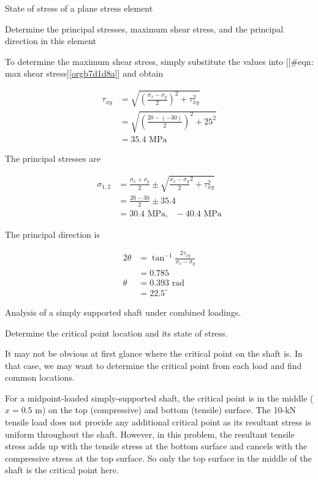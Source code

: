 \documentclass[a4paper,openany,12pt]{book}
\begin{document}
State of stress of a plane stress element

Determine the principal stresses, maximum shear stress, and the
principal direction in this element


To determine the maximum shear stress, simply substitute the values into
[[\#eqn: max shear stress]\ref{orgb7d1d8a}] and obtain

$$\begin{aligned}
      \tau_{xy} &= \sqrt {\left( \frac{\sigma_x - \sigma_y}{2} \right)^2 + \tau _{xy}^2}  \\ 
      &= \sqrt {\left( \frac{20 - ( - 30)}{2} \right)^2 + 25^2}  \\ 
      &= 35.4\text{ MPa}
    \end{aligned}$$

The principal stresses are

$$\begin{aligned}
      \sigma_{1,2} &= \frac{\sigma_x + \sigma_y}{2} \pm \sqrt {\frac{\sigma_x - \sigma_y}{2}^2 + \tau _{xy}^2}  \\ 
      &= \frac{20 - 30}{2} \pm 35.4 \\ 
      &= 30.4\text{ MPa}, \text{ } - 40.4\text{ MPa}
    \end{aligned}$$

The principal direction is

$$\begin{aligned}
      2\theta & = \tan^{-1}\frac{2\tau_{xy}}{\sigma_x - \sigma_y} \\ 
      &= 0.785 \\ 
      \theta  &= 0.393\text{ rad} \\ 
      &= 22.5^{\circ}
    \end{aligned}$$

Analysis of a simply supported shaft under combined loadings.


Determine the critical point location and its state of stress.

It may not be obvious at first glance where the critical point on the
shaft is. In that case, we may want to determine the critical point from
each load and find common locations.

For a midpoint-loaded simply-supported shaft, the critical point is in
the middle (\(x = 0.5\) m) on the top (compressive) and bottom (tensile)
surface. The 10-kN tensile load does not provide any additional critical
point as its resultant stress is uniform throughout the shaft. However,
in this problem, the resultant tensile stress adds up with the tensile
stress at the bottom surface and cancels with the compressive stress at
the top surface. So only the top surface in the middle of the shaft is
the critical point here.
\end{document}
